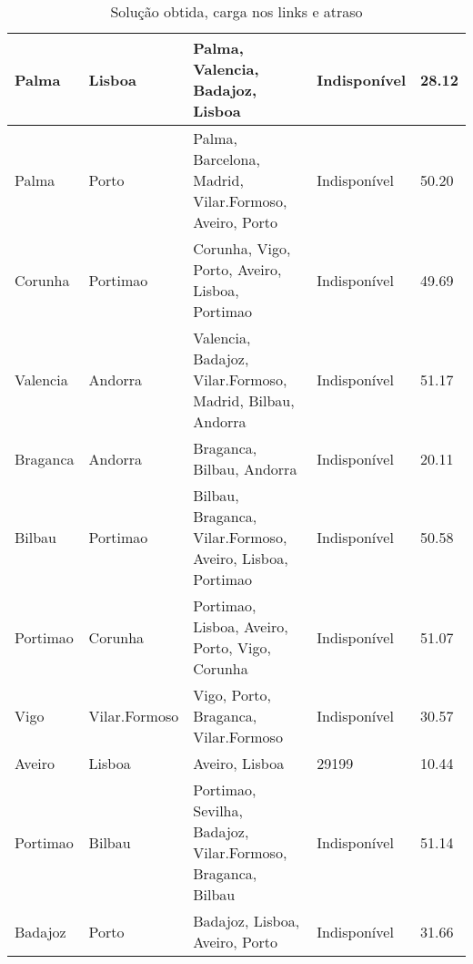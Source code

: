 \begin{table}[!htb]
{\begin{tabular}{|l|l|l|l|l|}
Palma & Lisboa & Palma, Valencia, Badajoz, Lisboa & Indisponível & 28.12 \\ \hline
Palma & Porto & Palma, Barcelona, Madrid, Vilar.Formoso, Aveiro, Porto & Indisponível & 50.20 \\ \hline
Corunha & Portimao & Corunha, Vigo, Porto, Aveiro, Lisboa, Portimao & Indisponível & 49.69 \\ \hline
Valencia & Andorra & Valencia, Badajoz, Vilar.Formoso, Madrid, Bilbau, Andorra & Indisponível & 51.17 \\ \hline
Braganca & Andorra & Braganca, Bilbau, Andorra & Indisponível & 20.11 \\ \hline
Bilbau & Portimao & Bilbau, Braganca, Vilar.Formoso, Aveiro, Lisboa, Portimao & Indisponível & 50.58 \\ \hline
Portimao & Corunha & Portimao, Lisboa, Aveiro, Porto, Vigo, Corunha & Indisponível & 51.07 \\ \hline
Vigo & Vilar.Formoso & Vigo, Porto, Braganca, Vilar.Formoso & Indisponível & 30.57 \\ \hline
Aveiro & Lisboa & Aveiro, Lisboa & 29199 & 10.44 \\ \hline
Portimao & Bilbau & Portimao, Sevilha, Badajoz, Vilar.Formoso, Braganca, Bilbau & Indisponível & 51.14 \\ \hline
Badajoz & Porto & Badajoz, Lisboa, Aveiro, Porto & Indisponível & 31.66 \\ \hline
\end{tabular}}
\caption[]{Solução obtida, carga nos links e atraso}
\end{table}

